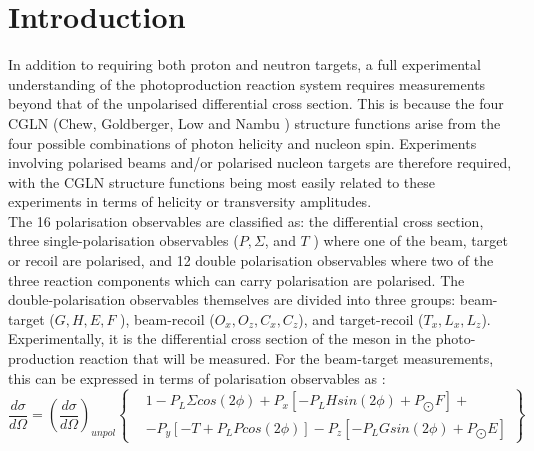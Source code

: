 \section{Introduction}
In addition to requiring both proton and neutron targets, a full experimental understanding of the photoproduction reaction system requires measurements
beyond that of the unpolarised differential cross section. This is because the four CGLN (Chew, Goldberger, Low and Nambu \cite{PhysRev.106.1337} \cite{PhysRev.106.1345}) structure functions arise from the four possible combinations of photon helicity and nucleon spin. Experiments involving polarised beams and/or polarised nucleon targets are therefore required, with the CGLN  structure functions being most easily related to these experiments in terms of helicity or transversity amplitudes. \\
The 16 polarisation observables are classified as: the differential cross section, three single-polarisation observables ($P, \Sigma$, and $T$ ) where one of the beam, target
or recoil are polarised, and 12 double polarisation observables where two of the three reaction components which can carry polarisation are polarised. The
double-polarisation observables themselves are divided into three groups: beam-target ($G, H, E, F$ ), beam-recoil ($O_x , O_z, C_x , C_z$), and target-recoil ($T_x , L_x , L_z$).
Experimentally, it is the differential cross section of the meson in the photo-production reaction that will be measured. For the beam-target measurements, this can be expressed in terms of polarisation observables as \cite{Bark_1974}:
\begin{equation}
\frac{d\sigma}{d\Omega} = \left(\frac{d\sigma}{d\Omega} \right)_{unpol}  \left\{ 
\begin{aligned}
    & 1 - P_L \Sigma cos(2\phi) + P_x \left[-P_L H sin(2\phi) + P_{\bigodot}F\right] + \\
& -P_y \left[ -T +P_L P cos(2\phi)\right] -P_z \left[-P_L G sin(2\phi) + P_{\bigodot}E\right]
\end{aligned}
\right\} 
\end{equation}
